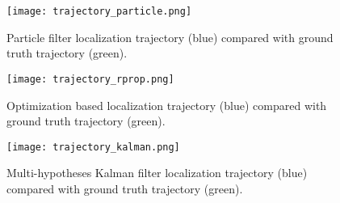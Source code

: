 

% 

\begin{figure}[!htbp]
\begin{center}
 	\texttt{[image: trajectory\_particle.png]}
\end{center}
\caption[Particle filter localization trajectory compared with ground truth trajectory.]{Particle filter localization trajectory (blue) compared with ground truth trajectory (green).}
\label{fig:benchmarkParticle}
\end{figure}

\begin{figure}[!htbp]
\begin{center}
	\texttt{[image: trajectory\_rprop.png]}
\end{center}
\caption[Optimization based localization trajectory compared with ground truth trajectory.]{Optimization based localization trajectory (blue) compared with ground truth trajectory (green).}
\label{fig:benchmarkRprop}
\end{figure}


\begin{figure}[!htbp]
\begin{center}
	\texttt{[image: trajectory\_kalman.png]}
\end{center}
\caption[Multi-hypotheses Kalman filter localization trajectory compared with ground truth trajectory.]{Multi-hypotheses Kalman filter localization trajectory (blue) compared with ground truth trajectory (green).}
\label{fig:benchmarkKalman}
\end{figure}
 



